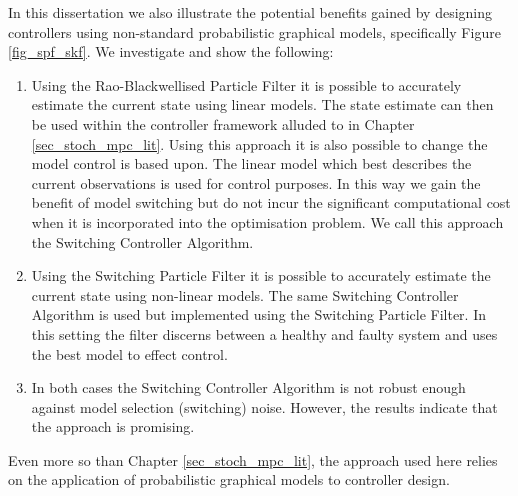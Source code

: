In this dissertation we also illustrate the potential benefits gained by designing controllers using non-standard probabilistic graphical models, specifically Figure \ref{fig_spf_skf}. We investigate and show the following:
\begin{enumerate}
\item
Using the Rao-Blackwellised Particle Filter it is possible to accurately estimate the current state using linear models. The state estimate can then be used within the controller framework alluded to in Chapter \ref{sec_stoch_mpc_lit}. Using this approach it is also possible to change the model control is based upon. The linear model which best describes the current observations is used for control purposes. In this way we gain the benefit of model switching but do not incur the significant computational cost when it is incorporated into the optimisation problem. We call this approach the Switching Controller Algorithm.
\item
Using the Switching Particle Filter it is possible to accurately estimate the current state using non-linear models. The same Switching Controller Algorithm is used but implemented using the Switching Particle Filter. In this setting the filter discerns between a healthy and faulty system and uses the best model to effect control.
\item
In both cases the Switching Controller Algorithm is not robust enough against model selection (switching) noise. However, the results indicate that the approach is promising.
\end{enumerate}
Even more so than Chapter \ref{sec_stoch_mpc_lit}, the approach used here relies on the application of probabilistic graphical models to controller design.  



